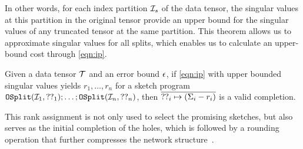 In other words, for each index partition $\mathcal{I}_s$ of the data tensor, the singular values at this partition in the original tensor provide an upper bound for the singular values of any truncated tensor at the same partition.
%
This theorem allows us to approximate singular values for all splits, which enables us to calculate an upper-bound cost through \cref{eqn:ip}.

\begin{theorem}\label{thm:cost-bound}
Given a data tensor $\mathcal{T}$ and an error bound $\epsilon$, if \cref{eqn:ip} with upper bounded singular values yields $r_1, \ldots, r_n$ for a sketch program $\mathtt{OSplit}(\mathcal{I}_1, ??_1); \ldots; \mathtt{OSplit}(\mathcal{I}_n, ??_n)$, then $\overline{??_i \mapsto (\Sigma_i - r_i)}$ is a valid completion.
\end{theorem}

This rank assignment is not only used to select the promising sketches, but also serves as the initial completion of the holes, which is followed by a rounding operation that further compresses the network structure~\cite{ht}.
